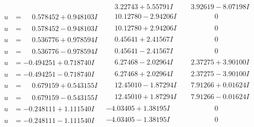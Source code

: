 \documentclass[1p]{elsarticle_modified}
\theoremstyle{definition}
\begin{document}
$$\begin{array}{c|c|c}
 & \phantom{-}3.22743 + 5.55791 I & \phantom{-}3.92619 - 8.07198 I \\ \hline\begin{aligned}
u &= \phantom{-}0.578452 + 0.948103 I\end{aligned}
 & \phantom{-}10.12780 - 2.94206 I & \phantom{-0.000000 } 0 \\ \hline\begin{aligned}
u &= \phantom{-}0.578452 - 0.948103 I\end{aligned}
 & \phantom{-}10.12780 + 2.94206 I & \phantom{-0.000000 } 0 \\ \hline\begin{aligned}
u &= \phantom{-}0.536776 + 0.978594 I\end{aligned}
 & \phantom{-}0.45641 + 2.41567 I & \phantom{-0.000000 } 0 \\ \hline\begin{aligned}
u &= \phantom{-}0.536776 - 0.978594 I\end{aligned}
 & \phantom{-}0.45641 - 2.41567 I & \phantom{-0.000000 } 0 \\ \hline\begin{aligned}
u &= -0.494251 + 0.718740 I\end{aligned}
 & \phantom{-}6.27468 - 2.02964 I & \phantom{-}2.37275 + 3.90100 I \\ \hline\begin{aligned}
u &= -0.494251 - 0.718740 I\end{aligned}
 & \phantom{-}6.27468 + 2.02964 I & \phantom{-}2.37275 - 3.90100 I \\ \hline\begin{aligned}
u &= \phantom{-}0.679159 + 0.543155 I\end{aligned}
 & \phantom{-}12.45010 - 1.87294 I & \phantom{-}7.91266 + 0.01624 I \\ \hline\begin{aligned}
u &= \phantom{-}0.679159 - 0.543155 I\end{aligned}
 & \phantom{-}12.45010 + 1.87294 I & \phantom{-}7.91266 - 0.01624 I \\ \hline\begin{aligned}
u &= -0.248111 + 1.111540 I\end{aligned}
 & -4.03405 + 1.38195 I & \phantom{-0.000000 } 0 \\ \hline\begin{aligned}
u &= -0.248111 - 1.111540 I\end{aligned}
 & -4.03405 - 1.38195 I & \phantom{-0.000000 } 0 \\ \hline\begin{aligned}

\end{aligned}
\end{array}$$
\end{document}
